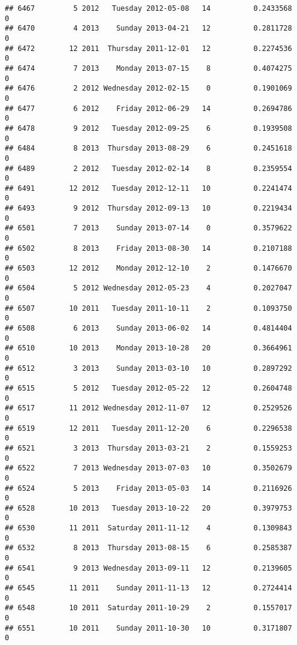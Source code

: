 \documentclass[
]{article}
\begin{document}
\begin{verbatim}
## 6467         5 2012   Tuesday 2012-05-08   14          0.2433568             0
## 6470         4 2013    Sunday 2013-04-21   12          0.2811728             0
## 6472        12 2011  Thursday 2011-12-01   12          0.2274536             0
## 6474         7 2013    Monday 2013-07-15    8          0.4074275             0
## 6476         2 2012 Wednesday 2012-02-15    0          0.1901069             0
## 6477         6 2012    Friday 2012-06-29   14          0.2694786             0
## 6478         9 2012   Tuesday 2012-09-25    6          0.1939508             0
## 6484         8 2013  Thursday 2013-08-29    6          0.2451618             0
## 6489         2 2012   Tuesday 2012-02-14    8          0.2359554             0
## 6491        12 2012   Tuesday 2012-12-11   10          0.2241474             0
## 6493         9 2012  Thursday 2012-09-13   10          0.2219434             0
## 6501         7 2013    Sunday 2013-07-14    0          0.3579622             0
## 6502         8 2013    Friday 2013-08-30   14          0.2107188             0
## 6503        12 2012    Monday 2012-12-10    2          0.1476670             0
## 6504         5 2012 Wednesday 2012-05-23    4          0.2027047             0
## 6507        10 2011   Tuesday 2011-10-11    2          0.1093750             0
## 6508         6 2013    Sunday 2013-06-02   14          0.4814404             0
## 6510        10 2013    Monday 2013-10-28   20          0.3664961             0
## 6512         3 2013    Sunday 2013-03-10   10          0.2897292             0
## 6515         5 2012   Tuesday 2012-05-22   12          0.2604748             0
## 6517        11 2012 Wednesday 2012-11-07   12          0.2529526             0
## 6519        12 2011   Tuesday 2011-12-20    6          0.2296538             0
## 6521         3 2013  Thursday 2013-03-21    2          0.1559253             0
## 6522         7 2013 Wednesday 2013-07-03   10          0.3502679             0
## 6524         5 2013    Friday 2013-05-03   14          0.2116926             0
## 6528        10 2013   Tuesday 2013-10-22   20          0.3979753             0
## 6530        11 2011  Saturday 2011-11-12    4          0.1309843             0
## 6532         8 2013  Thursday 2013-08-15    6          0.2585387             0
## 6541         9 2013 Wednesday 2013-09-11   12          0.2139605             0
## 6545        11 2011    Sunday 2011-11-13   12          0.2724414             0
## 6548        10 2011  Saturday 2011-10-29    2          0.1557017             0
## 6551        10 2011    Sunday 2011-10-30   10          0.3171807             0

\end{verbatim}
\end{document}
